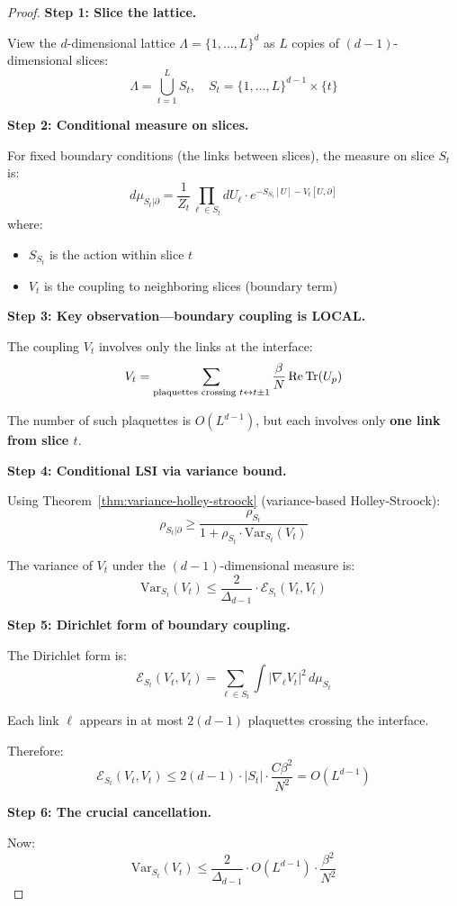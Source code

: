 \begin{proof}
\textbf{Step 1: Slice the lattice.}

View the $d$-dimensional lattice $\Lambda = \{1, \ldots, L\}^d$ as $L$ copies of 
$(d-1)$-dimensional slices:
\[
\Lambda = \bigcup_{t=1}^{L} S_t, \quad S_t = \{1, \ldots, L\}^{d-1} \times \{t\}
\]

\textbf{Step 2: Conditional measure on slices.}

For fixed boundary conditions (the links between slices), the measure on slice 
$S_t$ is:
\[
d\mu_{S_t | \partial} = \frac{1}{Z_t} \prod_{\ell \in S_t} dU_\ell \cdot e^{-S_{S_t}[U] - V_t[U, \partial]}
\]
where:
\begin{itemize}
\item $S_{S_t}$ is the action within slice $t$
\item $V_t$ is the coupling to neighboring slices (boundary term)
\end{itemize}

\textbf{Step 3: Key observation—boundary coupling is LOCAL.}

The coupling $V_t$ involves only the links at the interface:
\[
V_t = \sum_{\text{plaquettes crossing } t \leftrightarrow t\pm 1} \frac{\beta}{N}\operatorname{Re}\operatorname{Tr}(U_p)
\]

The number of such plaquettes is $O(L^{d-1})$, but each involves only 
\textbf{one link from slice $t$}.

\textbf{Step 4: Conditional LSI via variance bound.}

Using Theorem~\ref{thm:variance-holley-stroock} (variance-based Holley-Stroock):
\[
\rho_{S_t | \partial} \geq \frac{\rho_{S_t}}{1 + \rho_{S_t} \cdot \mathrm{Var}_{S_t}(V_t)}
\]

The variance of $V_t$ under the $(d-1)$-dimensional measure is:
\[
\mathrm{Var}_{S_t}(V_t) \leq \frac{2}{\Delta_{d-1}} \cdot \mathcal{E}_{S_t}(V_t, V_t)
\]

\textbf{Step 5: Dirichlet form of boundary coupling.}

The Dirichlet form is:
\[
\mathcal{E}_{S_t}(V_t, V_t) = \sum_{\ell \in S_t} \int |\nabla_\ell V_t|^2 \, d\mu_{S_t}
\]

Each link $\ell$ appears in at most $2(d-1)$ plaquettes crossing the interface.

Therefore:
\[
\mathcal{E}_{S_t}(V_t, V_t) \leq 2(d-1) \cdot |S_t| \cdot \frac{C\beta^2}{N^2} = O(L^{d-1})
\]

\textbf{Step 6: The crucial cancellation.}

Now:
\[
\mathrm{Var}_{S_t}(V_t) \leq \frac{2}{\Delta_{d-1}} \cdot O(L^{d-1}) \cdot \frac{\beta^2}{N^2}
\]


\end{proof}
